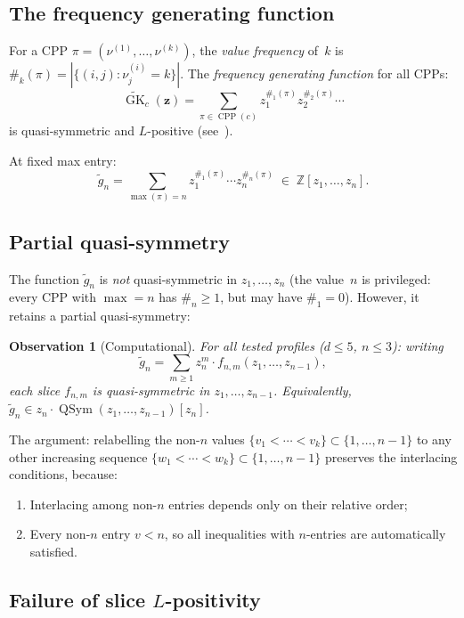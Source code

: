 \documentclass[11pt]{article}
\newtheorem{observation}[theorem]{Observation}
\newcommand{\Z}{\mathbb{Z}}
\newcommand{\CPP}{\operatorname{CPP}}
\newcommand{\GK}{\operatorname{GK}}
\newcommand{\QSym}{\operatorname{QSym}}
\begin{document}
\subsection{The frequency generating function}

For a CPP $\pi = (\nu^{(1)}, \ldots, \nu^{(k)})$, the
\emph{value frequency} of~$k$ is
$\#_k(\pi) = |\{(i,j) : \nu^{(i)}_j = k\}|$.
The \emph{frequency generating function} for all CPPs:
\[
  \widetilde{\GK}_c(\mathbf{z})
  = \sum_{\pi \in \CPP(c)}
  z_1^{\#_1(\pi)} z_2^{\#_2(\pi)} \cdots
\]
is quasi-symmetric and $L$-positive
(see~\cite{langer-qsym}).

At fixed max entry:
\[
  \tilde{g}_n = \sum_{\max(\pi) = n}
  z_1^{\#_1(\pi)} \cdots z_n^{\#_n(\pi)}
  \;\in\; \Z[z_1, \ldots, z_n].
\]

\subsection{Partial quasi-symmetry}

The function $\tilde{g}_n$ is \emph{not} quasi-symmetric
in $z_1, \ldots, z_n$ (the value~$n$ is privileged: every
CPP with $\max = n$ has $\#_n \geq 1$, but may have
$\#_1 = 0$). However, it retains a partial quasi-symmetry:

\begin{observation}[Computational]\label{obs:partial-qsym}
For all tested profiles ($d \leq 5$, $n \leq 3$): writing
\[
  \tilde{g}_n = \sum_{m \geq 1} z_n^m \cdot
  f_{n,m}(z_1, \ldots, z_{n-1}),
\]
each slice $f_{n,m}$ is quasi-symmetric in
$z_1, \ldots, z_{n-1}$. Equivalently,
$\tilde{g}_n \in z_n \cdot \QSym(z_1, \ldots, z_{n-1})[z_n]$.
\end{observation}

The argument: relabelling the non-$n$ values
$\{v_1 < \cdots < v_k\} \subset \{1, \ldots, n-1\}$ to
any other increasing sequence
$\{w_1 < \cdots < w_k\} \subset \{1, \ldots, n-1\}$
preserves the interlacing conditions, because:
\begin{enumerate}
  \item Interlacing among non-$n$ entries depends only
    on their relative order;
  \item Every non-$n$ entry $v < n$, so all inequalities
    with $n$-entries are automatically satisfied.
\end{enumerate}

\subsection{Failure of slice $L$-positivity}
\end{document}
